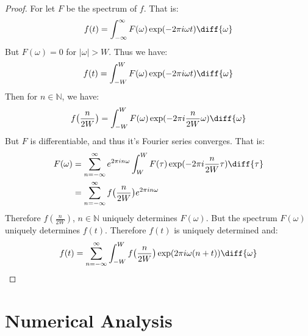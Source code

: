 \documentclass[crop=false,class=book,oneside]{standalone}
\begin{document}
            \begin{proof}
                For let $F$ be the spectrum of $f$. That is:
                \begin{equation}
                    f(t)=\int_{-\infty}^{\infty}F(\omega)
                    \exp(-2\pi{i}\omega{t})\diff{\omega}
                \end{equation}
                But $F(\omega)=0$ for $|\omega|>W$. Thus we have:
                \begin{equation}
                    f(t)=\int_{-W}^{W}F(\omega)
                    \exp(-2\pi{i}\omega{t})\diff{\omega}
                \end{equation}
                Then for $n\in\mathbb{N}$, we have:
                \begin{equation}
                    f\big(\frac{n}{2W}\big)=\int_{-W}^{W}F(\omega)
                    \exp(-2\pi{i}\frac{n}{2W}\omega)\diff{\omega}
                \end{equation}
                But $F$ is differentiable, and thus it's Fourier
                series converges. That is:
                \begin{subequations}
                    \begin{align}
                        F(\omega)
                        &=\sum_{n=-\infty}^{\infty}e^{2\pi{i}n\omega}
                        \int_{W}^{W}F(\tau)
                        \exp(-2\pi{i}\frac{n}{2W}\tau)\diff{\tau}\\
                        &=\sum_{n=-\infty}^{\infty}f
                          \big(\frac{n}{2W}\big)e^{2\pi{i}n\omega}
                    \end{align}
                \end{subequations}
                Therefore $f(\frac{n}{2W})$, $n\in \mathbb{N}$
                uniquely determines $F(\omega)$. But the
                spectrum $F(\omega)$ uniquely determines
                $f(t)$. Therefore $f(t)$ is
                uniquely determined and:
                \begin{equation}
                    f(t)=\sum_{n=-\infty}^{\infty}\int_{-W}^{W}
                    f\big(\frac{n}{2W}\big)
                    \exp(2\pi{i}\omega(n+t))\diff{\omega}
                \end{equation}
            \end{proof}
    \section{Numerical Analysis}
\end{document}
